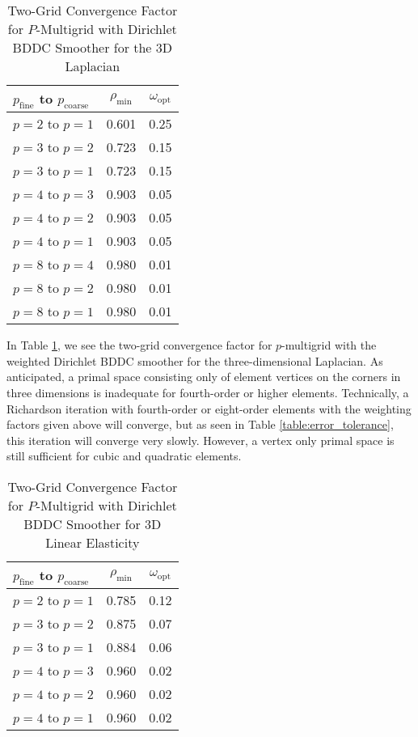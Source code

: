 \begin{table}[ht!]
\begin{center}
\begin{tabular}{l cc}
  \toprule
  $p_{\text{fine}}$ to $p_{\text{coarse}}$  & $\rho_{\min}$ & $\omega_{\text{opt}}$  \\
  \toprule
  $p = 2$ to $p = 1$   &  0.601 & 0.25  \\
  \midrule
  $p = 3$ to $p = 2$   &  0.723 & 0.15  \\
  $p = 3$ to $p = 1$   &  0.723 & 0.15  \\
  \midrule
  $p = 4$ to $p = 3$   &  0.903 & 0.05  \\
  $p = 4$ to $p = 2$   &  0.903 & 0.05  \\
  $p = 4$ to $p = 1$   &  0.903 & 0.05  \\
  \midrule
  $p = 8$ to $p = 4$   &  0.980 & 0.01  \\
  $p = 8$ to $p = 2$   &  0.980 & 0.01  \\
  $p = 8$ to $p = 1$   &  0.980 & 0.01  \\
  \bottomrule
\end{tabular}
\end{center}
\caption{Two-Grid Convergence Factor for $P$-Multigrid with Dirichlet BDDC Smoother for the 3D Laplacian}
\label{table:two_grid_bddc_smoother_3d}
\end{table}

In Table \ref{table:two_grid_bddc_smoother_3d}, we see the two-grid convergence factor for $p$-multigrid with the weighted Dirichlet BDDC smoother for the three-dimensional Laplacian.
As anticipated, a primal space consisting only of element vertices on the corners in three dimensions is inadequate for fourth-order or higher elements.
Technically, a Richardson iteration with fourth-order or eight-order elements with the weighting factors given above will converge, but as seen in Table \ref{table:error_tolerance}, this iteration will converge very slowly.
However, a vertex only primal space is still sufficient for cubic and quadratic elements.

\begin{table}[ht!]
\begin{center}
\begin{tabular}{l cc}
  \toprule
  $p_{\text{fine}}$ to $p_{\text{coarse}}$  & $\rho_{\min}$ & $\omega_{\text{opt}}$  \\
  \toprule
  $p = 2$ to $p = 1$   &  0.785 & 0.12  \\
  \midrule
  $p = 3$ to $p = 2$   &  0.875 & 0.07  \\
  $p = 3$ to $p = 1$   &  0.884 & 0.06  \\
  \midrule
  $p = 4$ to $p = 3$   &  0.960 & 0.02  \\
  $p = 4$ to $p = 2$   &  0.960 & 0.02  \\
  $p = 4$ to $p = 1$   &  0.960 & 0.02  \\
  \bottomrule
\end{tabular}
\end{center}
\caption{Two-Grid Convergence Factor for $P$-Multigrid with Dirichlet BDDC Smoother for 3D Linear Elasticity}
\label{table:two_grid_bddc_smoother_3d_lin_elas}
\end{table}


